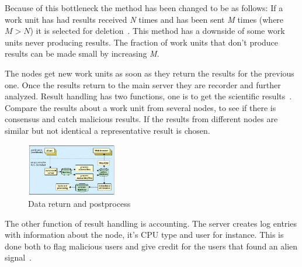 Because of this bottleneck the method has been changed to be as follows: 
If a work unit has had results received \textit{N} times and has been sent 
\textit{M} times (where $M>N$) it is selected for 
deletion~\cite{hid-sp18-601-paper-anderson2002seti}. This method has 
a downside of some work units never producing results. The fraction of work
units that don't produce results can be made small by increasing \textit{M}.

The nodes get new work units as soon as they return the results for the 
previous one. Once the results return to the main server they are recorder 
and further analyzed. Result handling has two functions, one is to 
get the scientific results~\cite{hid-sp18-601-paper-anderson2002seti}. 
Compare the results about a work unit from several nodes, to see if there 
is consensus and catch malicious results. 
If the results from different nodes are similar but not identical a 
representative result is chosen.

\begin{figure}[!htb]
        \centering
        \includegraphics[width=0.35\textwidth]{figures/data-return.jpg}
        \caption{Data return and 
        postprocess~\cite{hid-sp18-601-paper-anderson2002seti}}\label{datasend}
\end{figure}

The other function of result handling is accounting. The server creates 
log entries with information about the node, it's CPU type and user for 
instance. This is done both to flag malicious users and give credit for
the users that found an alien signal~\cite{hid-sp18-601-paper-anderson2002seti}.

